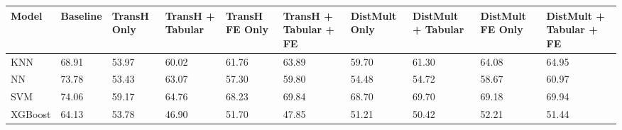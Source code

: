 \begin{tabular}{llllllllll}
\toprule
Model & Baseline & TransH Only & TransH + Tabular & TransH FE Only & TransH + Tabular + FE & DistMult Only & DistMult + Tabular & DistMult FE Only & DistMult + Tabular + FE \\
\midrule
KNN & 68.91 & 53.97 & 60.02 & 61.76 & 63.89 & 59.70 & 61.30 & 64.08 & 64.95 \\
NN & 73.78 & 53.43 & 63.07 & 57.30 & 59.80 & 54.48 & 54.72 & 58.67 & 60.97 \\
SVM & 74.06 & 59.17 & 64.76 & 68.23 & 69.84 & 68.70 & 69.70 & 69.18 & 69.94 \\
XGBoost & 64.13 & 53.78 & 46.90 & 51.70 & 47.85 & 51.21 & 50.42 & 52.21 & 51.44 \\
\bottomrule
\end{tabular}
